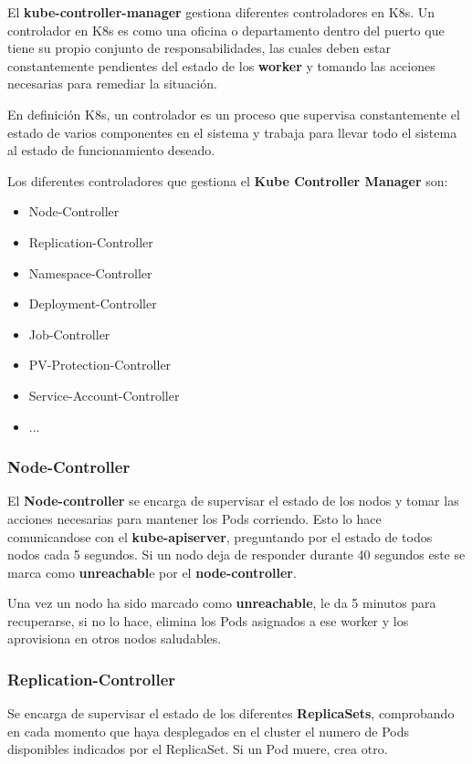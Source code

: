 \documentclass{article}
\begin{document}
El \textbf{kube-controller-manager} gestiona diferentes controladores en K8s. Un controlador en K8s es como una oficina o departamento dentro del puerto que tiene su propio conjunto de responsabilidades, las cuales deben estar constantemente pendientes del estado de los \textbf{worker} y tomando las acciones necesarias para remediar la situación.

En definición K8s, un controlador es un proceso que supervisa constantemente el estado de varios componentes en el sistema y trabaja para llevar todo el sistema al estado de funcionamiento deseado.

Los diferentes controladores que gestiona el \textbf{Kube Controller Manager} son:

\begin{itemize}
    \item Node-Controller
    \item Replication-Controller
    \item Namespace-Controller
    \item Deployment-Controller
    \item Job-Controller
    \item PV-Protection-Controller
    \item Service-Account-Controller
    \item ...
\end{itemize}

\subsubsection{Node-Controller}
El \textbf{Node-controller} se encarga de supervisar el estado de los nodos y tomar las acciones necesarias para mantener los Pods corriendo. Esto lo hace comunicandose con el \textbf{kube-apiserver}, preguntando por el estado de todos nodos cada 5 segundos. Si un nodo deja de responder durante 40 segundos este se marca como \textbf{unreachabl}e por el \textbf{node-controller}.

Una vez un nodo ha sido marcado como \textbf{unreachable}, le da 5 minutos para recuperarse, si no lo hace, elimina los Pods asignados a ese worker y los aprovisiona en otros nodos saludables.

\subsubsection{Replication-Controller}
Se encarga de supervisar el estado de los diferentes \textbf{ReplicaSets}, comprobando en cada momento que haya desplegados en el cluster el numero de Pods disponibles indicados por el ReplicaSet. Si un Pod muere, crea otro.
\end{document}

